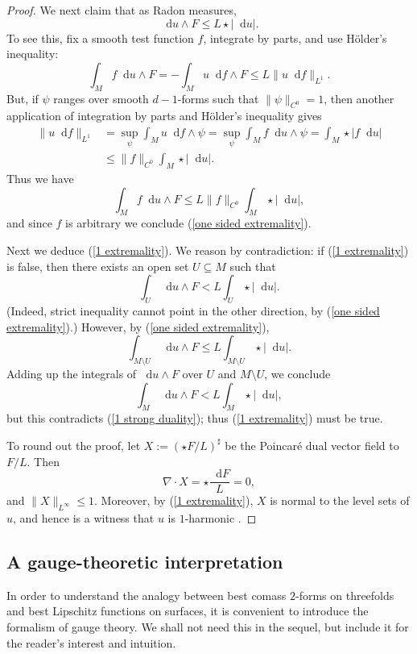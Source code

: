 \documentclass[reqno,11pt]{amsart}
\newcommand*\dif{\mathop{}\!\mathrm{d}}
\theoremstyle{definition}
\numberwithin{equation}{section}
\begin{document}
\begin{proof}
We next claim that as Radon measures, 
\begin{equation}\label{one sided extremality}
\dif u \wedge F \leq L \star |\dif u|.
\end{equation}
To see this, fix a smooth test function $f$, integrate by parts, and use H\"older's inequality:
$$\int_M f \dif u \wedge F = -\int_M u \dif f \wedge F \leq L \|u \dif f\|_{L^1}.$$
But, if $\psi$ ranges over smooth $d-1$-forms such that $\|\psi\|_{C^0} = 1$, then another application of integration by parts and H\"older's inequality gives
\begin{align*}
\|u \dif f\|_{L^1} &= \sup_\psi \int_M u \dif f \wedge \psi = \sup_\psi \int_M f \dif u \wedge \psi = \int_M \star |f \dif u| \\
&\leq \|f\|_{C^0} \int_M \star |\dif u|.
\end{align*}
Thus we have 
$$\int_M f \dif u \wedge F \leq L \|f\|_{C^0} \int_M \star |\dif u|,$$
and since $f$ is arbitrary we conclude (\ref{one sided extremality}).

Next we deduce (\ref{1 extremality}).
We reason by contradiction: if (\ref{1 extremality}) is false, then there exists an open set $U \subseteq M$ such that 
$$\int_U \dif u \wedge F < L \int_U \star |\dif u|.$$
(Indeed, strict inequality cannot point in the other direction, by (\ref{one sided extremality}).)
However, by (\ref{one sided extremality}), 
$$\int_{M \setminus U} \dif u \wedge F \leq L \int_{M \setminus U} \star |\dif u|.$$
Adding up the integrals of $\dif u \wedge F$ over $U$ and $M \setminus U$, we conclude 
$$\int_M \dif u \wedge F < L \int_M \star |\dif u|,$$
but this contradicts (\ref{1 strong duality}); thus (\ref{1 extremality}) must be true.

To round out the proof, let $X := (\star F/L)^\sharp$ be the Poincar\'e dual vector field to $F/L$. Then
$$\nabla \cdot X = \star \frac{\dif F}{L} = 0,$$
and $\|X\|_{L^\infty} \leq 1$.
Moreover, by (\ref{1 extremality}), $X$ is normal to the level sets of $u$, and hence is a witness that $u$ is $1$-harmonic \cite{Mazon14}.
\end{proof}

\subsection{A gauge-theoretic interpretation}
In order to understand the analogy between best comass $2$-forms on threefolds and best Lipschitz functions on surfaces, it is convenient to introduce the formalism of gauge theory.
We shall not need this in the sequel, but include it for the reader's interest and intuition.
\end{document}
